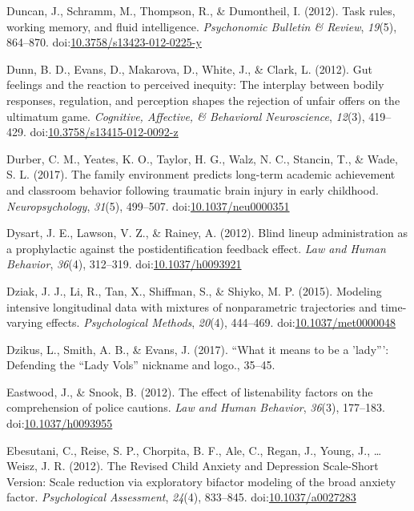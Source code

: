 \documentclass[english,man]{apa6}
\theoremstyle{definition}
\theoremstyle{definition}
\theoremstyle{definition}
\theoremstyle{remark}
\begin{document}
\hypertarget{ref-Duncan2012}{}
Duncan, J., Schramm, M., Thompson, R., \& Dumontheil, I. (2012). Task
rules, working memory, and fluid intelligence. \emph{Psychonomic
Bulletin \& Review}, \emph{19}(5), 864--870.
doi:\href{https://doi.org/10.3758/s13423-012-0225-y}{10.3758/s13423-012-0225-y}

\hypertarget{ref-Dunn2012}{}
Dunn, B. D., Evans, D., Makarova, D., White, J., \& Clark, L. (2012).
Gut feelings and the reaction to perceived inequity: The interplay
between bodily responses, regulation, and perception shapes the
rejection of unfair offers on the ultimatum game. \emph{Cognitive,
Affective, \& Behavioral Neuroscience}, \emph{12}(3), 419--429.
doi:\href{https://doi.org/10.3758/s13415-012-0092-z}{10.3758/s13415-012-0092-z}

\hypertarget{ref-Durber2017}{}
Durber, C. M., Yeates, K. O., Taylor, H. G., Walz, N. C., Stancin, T.,
\& Wade, S. L. (2017). The family environment predicts long-term
academic achievement and classroom behavior following traumatic brain
injury in early childhood. \emph{Neuropsychology}, \emph{31}(5),
499--507.
doi:\href{https://doi.org/10.1037/neu0000351}{10.1037/neu0000351}

\hypertarget{ref-Dysart2012}{}
Dysart, J. E., Lawson, V. Z., \& Rainey, A. (2012). Blind lineup
administration as a prophylactic against the postidentification feedback
effect. \emph{Law and Human Behavior}, \emph{36}(4), 312--319.
doi:\href{https://doi.org/10.1037/h0093921}{10.1037/h0093921}

\hypertarget{ref-Dziak2015}{}
Dziak, J. J., Li, R., Tan, X., Shiffman, S., \& Shiyko, M. P. (2015).
Modeling intensive longitudinal data with mixtures of nonparametric
trajectories and time-varying effects. \emph{Psychological Methods},
\emph{20}(4), 444--469.
doi:\href{https://doi.org/10.1037/met0000048}{10.1037/met0000048}

\hypertarget{ref-Dzikus2017}{}
Dzikus, L., Smith, A. B., \& Evans, J. (2017). ``What it means to be a
'lady''': Defending the ``Lady Vols'' nickname and logo., 35--45.

\hypertarget{ref-Eastwood2011}{}
Eastwood, J., \& Snook, B. (2012). The effect of listenability factors
on the comprehension of police cautions. \emph{Law and Human Behavior},
\emph{36}(3), 177--183.
doi:\href{https://doi.org/10.1037/h0093955}{10.1037/h0093955}

\hypertarget{ref-Ebesutani2012}{}
Ebesutani, C., Reise, S. P., Chorpita, B. F., Ale, C., Regan, J., Young,
J., \ldots{} Weisz, J. R. (2012). The Revised Child Anxiety and
Depression Scale-Short Version: Scale reduction via exploratory bifactor
modeling of the broad anxiety factor. \emph{Psychological Assessment},
\emph{24}(4), 833--845.
doi:\href{https://doi.org/10.1037/a0027283}{10.1037/a0027283}
\end{document}
